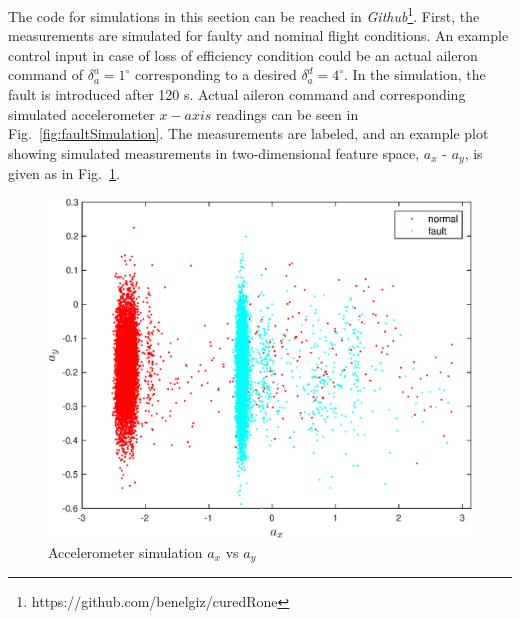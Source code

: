 The code for simulations in this section can be reached in \emph{Github}\footnote{https://github.com/benelgiz/curedRone}. 
First, the measurements are simulated for faulty and nominal flight conditions. 
An example control input in case of loss of efficiency condition could be an actual aileron command of $\delta_{a}^a=1^\circ$ corresponding to a desired $\delta_{a}^d=4^\circ$. In the simulation, the fault is introduced after 120 s. Actual aileron command and corresponding simulated accelerometer $x-axis$ readings can be seen in Fig.~\ref{fig:faultSimulation}. 
The measurements are labeled, and an example plot showing simulated measurements in two-dimensional feature space, $a_x$ - $a_y$, is given as in Fig.~\ref{fig:feat1vsfeat2}. 

\begin{figure}
\begin{center}
\includegraphics[width=12cm]{figures/feat1vsfeat2}    %
\caption{Accelerometer simulation $a_x$ vs $a_y$ } 
\label{fig:feat1vsfeat2}
\end{center}
\end{figure}


